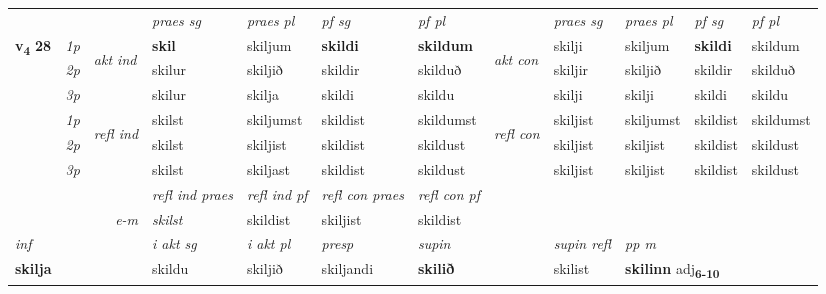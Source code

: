 \begin{longtable}[l]{X>{\footnotesize\itshape}llXXXXlXXXX}
 & &   & \textit{praes sg}  & \textit{praes pl}    & \textit{ pf sg} & \textit{pf pl} & & \textit{praes sg}  & \textit{praes pl}    & \textit{pf sg} & \textit{pf pl }  \\ \cmidrule{4-7} \cmidrule{9-12}
 \multirow{2}{*}{{{\textbf{v{\textsubscript{4}}} \Large{\textbf{28}}}}}  & 1p & \multirow{3}{*}{\begin{turn}{90}\textit{akt ind}\end{turn}} & \textbf{skil} & skiljum & \textbf{skildi} & \textbf{skildum} & \multirow{3}{*}{\begin{turn}{90}\textit{akt con}\end{turn}} &skilji & skiljum & \textbf{skildi} & skildum\\*
 & 2p &  &  skilur  & skiljið & skildir & skilduð & & skiljir & skiljið & skildir & skilduð \\*
 & 3p &  & skilur & skilja & skildi & skildu & & skilji & skilji& skildi & skildu \\*
\cmidrule{4-7} \cmidrule{9-12}
 & 1p & \multirow{3}{*}{\begin{turn}{90}\textit{refl ind}\end{turn}}  & skilst & skiljumst & skildist & skildumst & \multirow{3}{*}{\begin{turn}{90}\textit{refl con}\end{turn}}  &skiljist & skiljumst & skildist & skildumst \\*
 & 2p &  & skilst & skiljist & skildist & skildust & &skiljist & skiljist & skildist & skildust \\*
 & 3p  & & skilst & skiljast & skildist & skildust & & skiljist & skiljist& skildist & skildust \\*
\cmidrule{4-7} \cmidrule{9-12}

 & && \textit{refl ind praes} & \textit{refl ind pf} & \textit{refl con praes} & \textit{refl con pf} \\*
\multicolumn{3}{r}{\textit{e-m}}& skilst & skildist & skiljist & skildist \\*

\cmidrule{4-7}
   {\textit{inf}} & &  & \textit{i akt sg} & \textit{i akt pl}   & \textit{presp} & \textit{supin} && \textit{supin refl} & \textit{pp m} \\*
  {\textbf{skilja}} & && skildu  & skiljið   & skiljandi &  \textbf{skilið} && skilist & \multicolumn{2}{l}{\textbf{skilinn} adj\textbf{\textsubscript{6-10}}} \\*

\midrule


\end{longtable}
